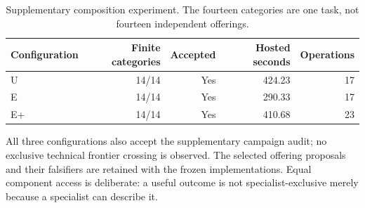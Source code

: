 \begin{table}[H]\centering\small
\begin{tabular}{@{}lrrrr@{}}\toprule
Configuration & Finite categories & Accepted & Hosted seconds & Operations \\ \midrule
U & 14/14 & Yes & 424.23 & 17 \\
E & 14/14 & Yes & 290.33 & 17 \\
E+ & 14/14 & Yes & 410.68 & 23 \\
\bottomrule\end{tabular}
\caption{Supplementary composition experiment. The fourteen categories are one task, not fourteen independent offerings.}
\end{table}
All three configurations also accept the supplementary campaign audit; no exclusive technical frontier crossing is observed. The selected offering proposals and their falsifiers are retained with the frozen implementations. Equal component access is deliberate: a useful outcome is not specialist-exclusive merely because a specialist can describe it.
